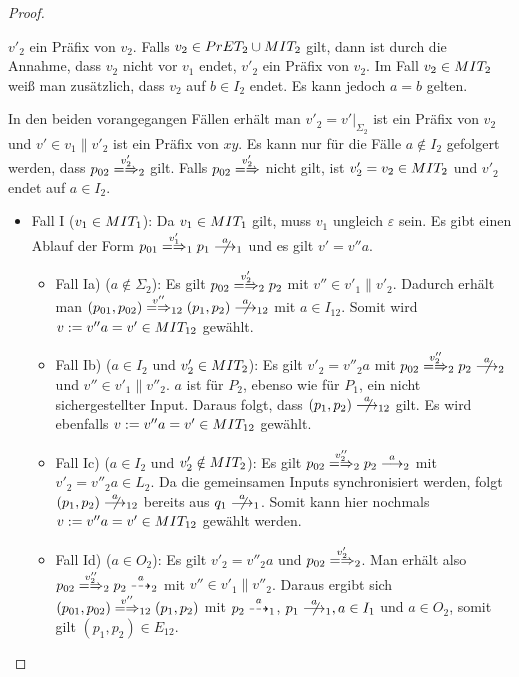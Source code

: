 \begin{proof}
\begin{itemize}
      $v'_2$ ein Präfix von $v_2$. Falls $v_2\in PrET _2\cup MIT _2$ gilt,
      dann ist durch die Annahme, dass $v_2$ nicht vor $v_1$ endet, $v'_2$ ein
      Präfix von $v_2$. Im Fall $v_2 \in MIT _2$ weiß man zusätzlich, dass
      $v_2$ auf $b\in I_2$ endet. Es kann jedoch $a=b$ gelten.
  \end{itemize}
  In den beiden vorangegangen Fällen erhält man $v'_2=v'|_{\Sigma _2}$ ist ein
  Präfix von $v_2$ und $v'\in v_1\|v'_2$ ist ein Präfix von $xy$. Es kann nur
  für die Fälle $a\notin I_2$ gefolgert werden, dass $p_{02} \weakmay[v'_2]_2$
  gilt. Falls $p_{02} \weakmay[v'_2]$ nicht gilt, ist $v'_2=v_2\in MIT _2$ und
  $v'_2$ endet auf $a\in I_2$.
  \begin{itemize}
    \item Fall I ($v_1\in MIT _1$): Da $v_1\in MIT _1$ gilt, muss $v_1$
      ungleich $\varepsilon$ sein. Es gibt einen Ablauf der Form
      $p_{01}\weakmay[v'_1]_1p_1\nmust[a]_1$ und es gilt $v'=v''a$.
      \begin{itemize}
        \item Fall Ia) ($a\notin\Sigma _2$): Es gilt $p_{02}\weakmay[v'_2]_2
          p_2$ mit $v''\in v'_1\|v'_2$. Dadurch erhält man $(p_{01},p_{02})
          \weakmay[v'']_{12} (p_1,p_2) \nmust[a]_{12}$ mit $a\in I_{12}$. Somit
          wird $v := v''a=v'\in MIT _{12}$ gewählt.
        \item Fall Ib) ($a\in I_2$ und $v'_2\in MIT _2$): Es gilt $v'_2=v''_2a$
          mit $p_{02}\weakmay[v''_2]_2 p_2 \nmust[a]_2$ und $v''\in
          v'_1\|v''_2$. $a$ ist für $P_2$, ebenso wie für $P_1$, ein nicht
          sichergestellter Input. Daraus folgt, dass $(p_1,p_2)\nmust[a]_{12}$
          gilt. Es wird ebenfalls $v := v''a=v'\in MIT _{12}$ gewählt.
        \item Fall Ic) ($a\in I_2$ und $v'_2\notin MIT _2$): Es gilt
          $p_{02}\weakmay[v''_2]_2p_2\must[a]_2$ mit $v'_2=v''_2a \in L_2$. Da
          die gemeinsamen Inputs synchronisiert werden, folgt $(p_1,p_2)
          \nmust[a]_{12}$ bereits aus $q_1\nmust[a]_1$. Somit kann hier
          nochmals $v:=v''a=v'\in MIT _{12}$ gewählt werden.
        \item Fall Id) ($a\in O_2$): Es gilt $v'_2=v''_2a$ und $p_{02}
          \weakmay[v'_2]_2$. Man erhält also $p_{02}\weakmay[v''_2]_2 p_2 \may[a]_2$
          mit $v''\in v'_1\|v''_2$. Daraus ergibt sich $(p_{01},p_{02})
          \weakmay[v'']_{12} (p_1,p_2)$ mit $p_2\may[a]_1$, $p_1\nmust[a]_1,
          a\in I_1$ und $a\in O_2$, somit gilt $(p_1,p_2)\in E_{12}$.

\end{itemize}
\end{itemize}
\end{proof}
